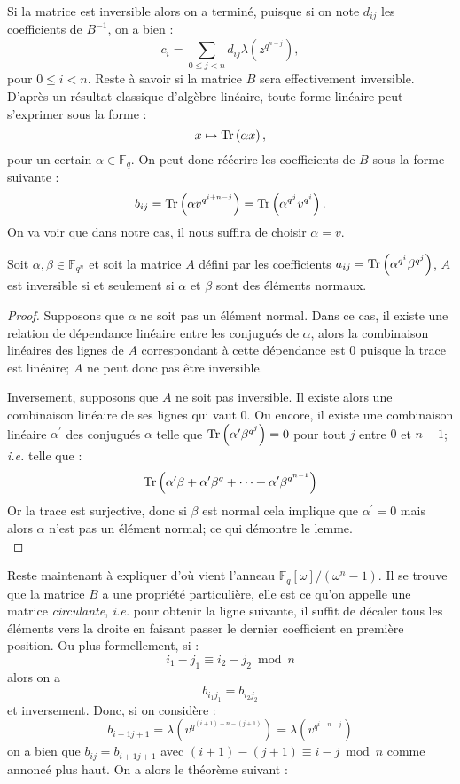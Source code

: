 \documentclass[a4paper]{article} %
\numberwithin{section}{part}
\numberwithin{equation}{section}
\newcommand\GF[1]{\mathbb{F}_{#1}}
\newcommand\Tr[1]{\textup{Tr}\left(#1\right)}
\begin{document}
Si la matrice est inversible alors on a terminé, puisque si on note $d_{ij}$ les
coefficients de $B^{-1}$, on a bien :
\begin{equation}
c_i = \sum_{0\leq j < n}{d_{ij}\lambda\left(z^{q^{n-j}}\right)},
\end{equation}
pour $0\leq i < n$. Reste à savoir si la matrice $B$ sera effectivement 
inversible.
D'après un résultat classique d'algèbre linéaire, toute forme linéaire peut
s'exprimer sous la forme :
\begin{equation}
x \mapsto \Tr{\alpha x},
\end{equation}
pour un certain $\alpha\in\GF{q}$. On peut donc réécrire les coefficients de $B$
sous la forme suivante :
\begin{equation}
b_{ij} = \Tr{\alpha v^{q^{i+n-j}}} = \Tr{\alpha^{q^j}v^{q^i}}.
\end{equation}
On va voir que dans notre cas, il nous suffira de choisir $\alpha = v$.

\begin{lem}
\label{lem:mattrinv}
Soit $\alpha,\beta\in\GF{q^n}$ et soit la matrice $A$ défini par les 
coefficients $a_{ij} = \Tr{\alpha^{q^i}\beta^{q^j}}$, $A$ est inversible si et 
seulement si $\alpha$ et $\beta$ sont des éléments normaux.
\end{lem}
\begin{proof}
Supposons que $\alpha$ ne soit pas un élément normal. Dans ce cas, il existe une
relation de dépendance linéaire entre les conjugués de $\alpha$, alors la 
combinaison linéaires des lignes de $A$ correspondant à cette dépendance est $0$
puisque la trace est linéaire; $A$ ne peut donc pas être inversible.\par
Inversement, supposons que $A$ ne soit pas inversible. Il existe alors une 
combinaison linéaire de ses lignes qui vaut $0$. Ou encore, il existe une 
combinaison linéaire $\alpha^{\prime}$ des conjugués $\alpha$ telle que 
$\Tr{\alpha^{\prime}\beta^{q^j}} = 0$ pour tout $j$ entre $0$ et $n-1$; 
\textit{i.e.} telle que :
\[\Tr{\alpha^{\prime}\beta + \alpha^{\prime}\beta^q + \dots + 
\alpha^{\prime}\beta^{q^{n-1}}}\]
Or la trace est surjective, donc si $\beta$ est normal cela implique que 
$\alpha^{\prime} = 0$ mais alors $\alpha$ n'est pas un élément normal; ce qui 
démontre le lemme.\\
\end{proof}
Reste maintenant à expliquer d'où vient l'anneau 
$\mathbb{F}_q[\omega]/(\omega^n - 1)$. Il se trouve que la matrice $B$ a une 
propriété particulière, elle est ce qu'on appelle une matrice \emph{circulante},
\textit{i.e.} pour obtenir la ligne suivante, il suffit de décaler tous les 
éléments vers la droite en faisant passer le dernier coefficient en première 
position. Ou plus formellement, si :
\[i_1 - j_1 \equiv i_2 - j_2 \bmod n\]
alors on a 
\[b_{i_1j_1} = b_{i_2j_2}\]
et inversement. Donc, si on considère :
\[b_{i+1j+1} = \lambda\left(v^{q^{(i+1) + n - (j+1)}}\right) = 
\lambda\left(v^{q^{i+n-j}}\right)\]
on a bien que $b_{ij} = b_{i+1j+1}$ avec $(i+1) - (j+1) \equiv i - j \bmod n$ 
comme annoncé plus haut. On a alors le théorème suivant :
\end{document}
